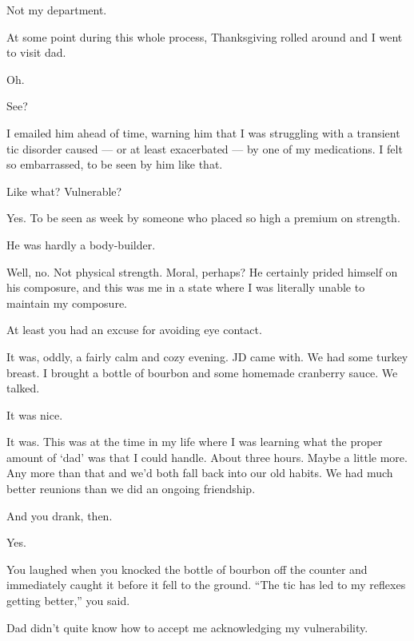 \begin{paracol}{2}
\begin{leftcolumn}
\begin{ally}
Not my department.
\end{ally}
At some point during this whole process, Thanksgiving rolled around and I went to visit dad.

\begin{ally}
Oh.
\end{ally}
See?

I emailed him ahead of time, warning him that I was struggling with a transient tic disorder caused --- or at least exacerbated --- by one of my medications. I felt so embarrassed, to be seen by him like that.

\begin{ally}
Like what? Vulnerable?
\end{ally}
Yes. To be seen as week by someone who placed so high a premium on strength.

\begin{ally}
He was hardly a body-builder.
\end{ally}
Well, no. Not physical strength. Moral, perhaps? He certainly prided himself on his composure, and this was me in a state where I was literally unable to maintain my composure.

\begin{ally}
At least you had an excuse for avoiding eye contact.
\end{ally}
It was, oddly, a fairly calm and cozy evening. JD came with. We had some turkey breast. I brought a bottle of bourbon and some homemade cranberry sauce. We talked.

\begin{ally}
It was nice.
\end{ally}
It was. This was at the time in my life where I was learning what the proper amount of `dad' was that I could handle. About three hours. Maybe a little more. Any more than that and we'd both fall back into our old habits. We had much better reunions than we did an ongoing friendship.

\begin{ally}
And you drank, then.
\end{ally}
Yes.

\begin{ally}
You laughed when you knocked the bottle of bourbon off the counter and immediately caught it before it fell to the ground. ``The tic has led to my reflexes getting better,'' you said.
\end{ally}
Dad didn't quite know how to accept me acknowledging my vulnerability.


\end{leftcolumn}
\end{paracol}
